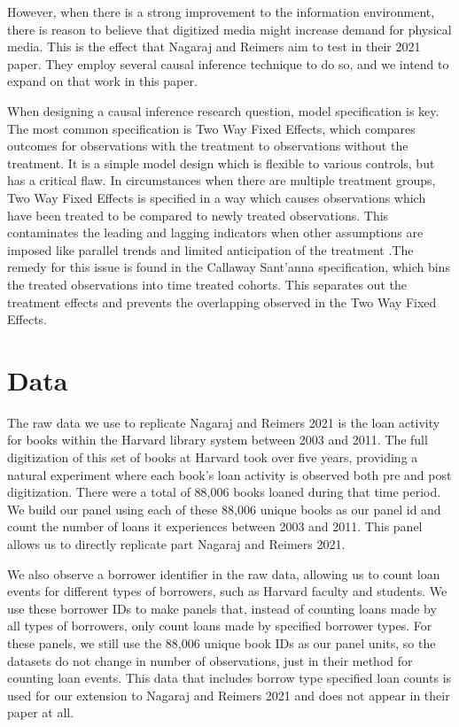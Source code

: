\documentclass{article}
\begin{document}
However, when there is a strong improvement to the information environment, there is reason to believe that digitized media might increase demand for physical media. This is the effect that Nagaraj and Reimers aim to test in their 2021 paper. They employ several causal inference technique to do so, and we intend to expand on that work in this paper. 

When designing a causal inference research question, model specification is key. The most common specification is Two Way Fixed Effects, which compares outcomes for observations with the treatment to observations without the treatment. It is a simple model design which is flexible to various controls, but has a critical flaw. In circumstances when there are multiple treatment groups, Two Way Fixed Effects is specified in a way which causes observations which have been treated to be compared to newly treated observations. This contaminates the leading and lagging indicators when other assumptions are imposed like parallel trends and limited anticipation of the treatment \cite{sun2021estimating}.The remedy for this issue is found in the Callaway Sant'anna \cite{callaway2021difference} specification, which bins the treated observations into time treated cohorts. This separates out the treatment effects and prevents the overlapping observed in the Two Way Fixed Effects. 

\section{Data}
The raw data we use to replicate Nagaraj and Reimers 2021 is the loan activity for books within the Harvard library system between 2003 and 2011. The full digitization of this set of books at Harvard took over five years, providing a natural experiment where each book's loan activity is observed both pre and post digitization. There were a total of 88,006 books loaned during that time period. We build our panel using each of these 88,006 unique books as our panel id and count the number of loans it experiences between 2003 and 2011. This panel allows us to directly replicate part Nagaraj and Reimers 2021. 

We also observe a borrower identifier in the raw data, allowing us to count loan events for different types of borrowers, such as Harvard faculty and students. We use these borrower IDs to make panels that, instead of counting loans made by all types of borrowers, only count loans made by specified borrower types. For these panels, we still use the 88,006 unique book IDs as our panel units, so the datasets do not change in number of observations, just in their method for counting loan events. This data that includes borrow type specified loan counts is used for our extension to Nagaraj and Reimers 2021 and does not appear in their paper at all. 
\end{document}
